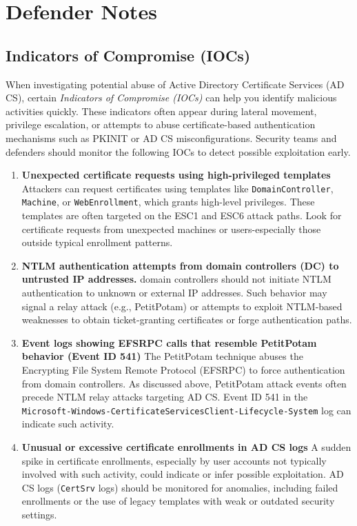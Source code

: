 \section{Defender Notes}
\subsection{Indicators of Compromise (IOCs)}
When investigating potential abuse of Active Directory Certificate Services (AD CS), certain \textit{Indicators of Compromise (IOCs)} can help you identify malicious activities quickly. These indicators often appear during lateral movement, privilege escalation, or attempts to abuse certificate-based authentication mechanisms such as PKINIT or AD CS misconfigurations. Security teams and defenders should monitor the following IOCs to detect possible exploitation early.
\begin{enumerate}
    \item \textbf{Unexpected certificate requests using high-privileged templates}
Attackers can request certificates using templates like \verb|DomainController|, \verb|Machine|, or \verb|WebEnrollment|, which grants high-level privileges. These templates are often targeted on the ESC1 and ESC6 attack paths. Look for certificate requests from unexpected machines or users-especially those outside typical enrollment patterns.
         \item \textbf{NTLM authentication attempts from domain controllers (DC) to untrusted IP addresses.}
domain controllers should not initiate NTLM authentication to unknown or external IP addresses. Such behavior may signal a relay attack (e.g., PetitPotam) or attempts to exploit NTLM-based weaknesses to obtain ticket-granting certificates or forge authentication paths.
         \item \textbf{Event logs showing EFSRPC calls that resemble PetitPotam behavior (Event ID 541)}
         The PetitPotam technique abuses the Encrypting File System Remote Protocol (EFSRPC) to force authentication from domain controllers. As discussed above, PetitPotam attack events often precede NTLM relay attacks targeting AD CS. Event ID 541 in the \verb|Microsoft-Windows-CertificateServicesClient-Lifecycle-System| log can indicate such activity.
         \item \textbf{Unusual or excessive certificate enrollments in AD CS logs}
         A sudden spike in certificate enrollments, especially by user accounts not typically involved with such activity, could indicate or infer possible exploitation. AD CS logs (\verb|CertSrv| logs) should be monitored for anomalies, including failed enrollments or the use of legacy templates with weak or outdated security settings.
\end{enumerate}
